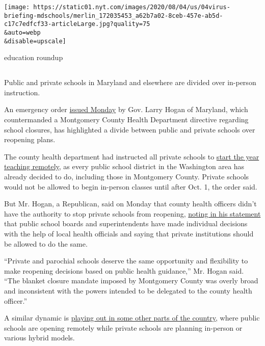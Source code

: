 \texttt{[image: https://static01.nyt.com/images/2020/08/04/us/04virus-briefing-mdschools/merlin\_172035453\_a62b7a02-8ceb-457e-ab5d-c17c7edfcf33-articleLarge.jpg?quality=75\\\&auto=webp\\\&disable=upscale]}

education roundup

\subsection{}

Public and private schools in Maryland and elsewhere are divided over
in-person instruction.

An emergency order
\href{https://twitter.com/GovLarryHogan/status/1290330304830246912}{issued
Monday} by Gov. Larry Hogan of Maryland, which countermanded a
Montgomery County Health Department directive regarding school closures,
has highlighted a divide between public and private schools over
reopening plans.

The county health department had instructed all private schools to
\href{https://www.montgomerycountymd.gov/OPI/Resources/Files/pdf/2020/NonPublicSchools_07-31-20.pdf}{start
the year teaching remotely}, as every public school district in the
Washington area has already decided to do, including those in Montgomery
County. Private schools would not be allowed to begin in-person classes
until after Oct. 1, the order said.

But Mr. Hogan, a Republican, said on Monday that county health officers
didn't have the authority to stop private schools from reopening,
\href{https://twitter.com/GovLarryHogan/status/1290330304830246912/photo/1}{noting
in his statement} that public school boards and superintendents have
made individual decisions with the help of local health officials and
saying that private institutions should be allowed to do the same.

``Private and parochial schools deserve the same opportunity and
flexibility to make reopening decisions based on public health
guidance,'' Mr. Hogan said. ``The blanket closure mandate imposed by
Montgomery County was overly broad and inconsistent with the powers
intended to be delegated to the county health officer.''

A similar dynamic is
\href{https://www.nytimes.com/2020/07/16/upshot/coronavirus-school-reopening-private-public-gap.html}{playing
out in some other parts of the country}, where public schools are
opening remotely while private schools are planning in-person or various
hybrid models.

